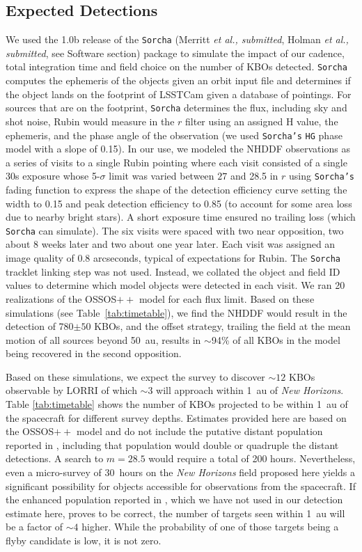 \documentclass[modern,linenumbers,trackchanges,preprint]{aastex631}
\begin{document}
\subsection{Expected Detections}
We used the 1.0b release of the \texttt{Sorcha} (Merritt {\it et al., submitted}, Holman {\it et al., submitted}, see Software section) package to simulate the impact of our cadence, total integration time and field choice on the number of KBOs detected. 
\texttt{Sorcha} computes the ephemeris of the objects given an orbit input file and determines if the object lands on the footprint of LSSTCam given a database of pointings.  
For sources that are on the footprint, \texttt{Sorcha} determines the flux, including sky and shot noise, Rubin would measure in the $r$ filter using an assigned H value, the ephemeris, and the phase angle of the observation (we used \texttt{Sorcha's} \texttt{HG} phase model with a slope of 0.15). 
In our use, we modeled the NHDDF observations as a series of visits to a single Rubin pointing where each visit consisted of a single 30s exposure whose 5-$\sigma$ limit was varied between $27$ and 28.5 in $r$ using \texttt{Sorcha's} fading function to express the shape of the detection efficiency curve setting the width to 0.15 and peak detection efficiency to 0.85 (to account for some area loss due to nearby bright stars).  
A short exposure time ensured no trailing loss (which \texttt{Sorcha} can simulate).  
The six visits were spaced with two near opposition, two about 8 weeks later and two about one year later. 
Each visit was assigned an image quality of 0.8 arcseconds, typical of expectations for Rubin.
The \texttt{Sorcha} tracklet linking step was not used. Instead, we collated the object and field ID values to determine which model objects were detected in each visit. 
We ran 20 realizations of the OSSOS$++$ model for each flux limit.
Based on these simulations (see Table~\ref{tab:timetable}), we find the NHDDF would result in the detection of 780$\pm{50}$ KBOs, and the offset strategy, trailing the field at the mean motion of all sources beyond 50~au, results in $\sim$94\% of all KBOs in the model being recovered in the second opposition.

Based on these simulations, we expect the survey to discover $\sim12$ KBOs observable by LORRI of which $\sim$3 will approach within 1~au of {\it New Horizons}.
Table \ref{tab:timetable} shows the number of KBOs projected to be within 1~au of the spacecraft for different survey depths. Estimates provided here are based on the OSSOS$++$ model and do not include the putative distant population reported in \citep{Fraser2024PSJ}, including that population would double or quadruple the distant detections. 
A search to $m=28.5$ would require a total of 200 hours. Nevertheless, even a micro-survey of 30~hours on the {\it New Horizons} field proposed here yields a significant possibility for objects accessible for observations from the spacecraft. 
If the enhanced population reported in \citep{Fraser2024PSJ}, which we have not used in our detection estimate here, proves to be correct, the number of targets seen within 1~au will be a factor of $\sim4$ higher. 
While the probability of one of those targets being a flyby candidate is low, it is not zero.
\end{document}
